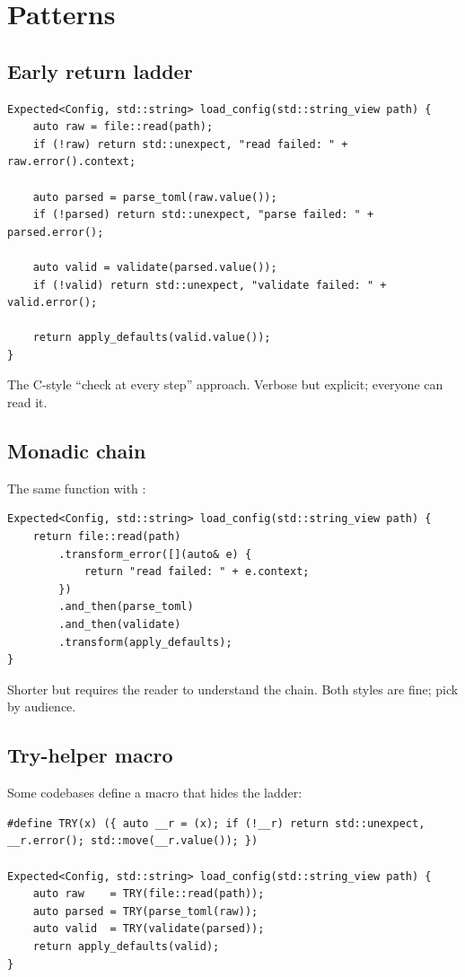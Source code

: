 \section{Patterns}

\subsection*{Early return ladder}

\begin{lstlisting}
Expected<Config, std::string> load_config(std::string_view path) {
    auto raw = file::read(path);
    if (!raw) return std::unexpect, "read failed: " + raw.error().context;

    auto parsed = parse_toml(raw.value());
    if (!parsed) return std::unexpect, "parse failed: " + parsed.error();

    auto valid = validate(parsed.value());
    if (!valid) return std::unexpect, "validate failed: " + valid.error();

    return apply_defaults(valid.value());
}
\end{lstlisting}

The C-style ``check at every step'' approach. Verbose but
explicit; everyone can read it.

\subsection*{Monadic chain}

The same function with :

\begin{lstlisting}
Expected<Config, std::string> load_config(std::string_view path) {
    return file::read(path)
        .transform_error([](auto& e) {
            return "read failed: " + e.context;
        })
        .and_then(parse_toml)
        .and_then(validate)
        .transform(apply_defaults);
}
\end{lstlisting}

Shorter but requires the reader to understand the chain. Both
styles are fine; pick by audience.

\subsection*{Try-helper macro}

Some codebases define a  macro that hides the ladder:

\begin{lstlisting}
#define TRY(x) ({ auto __r = (x); if (!__r) return std::unexpect, __r.error(); std::move(__r.value()); })

Expected<Config, std::string> load_config(std::string_view path) {
    auto raw    = TRY(file::read(path));
    auto parsed = TRY(parse_toml(raw));
    auto valid  = TRY(validate(parsed));
    return apply_defaults(valid);
}
\end{lstlisting}

